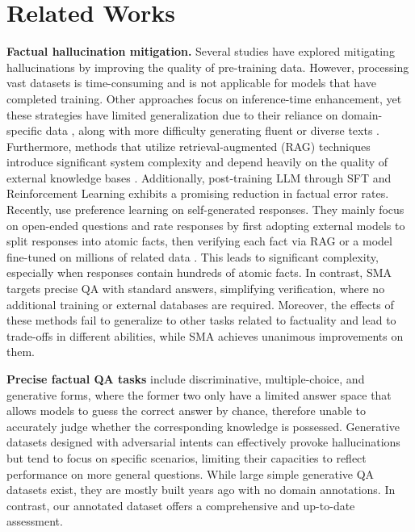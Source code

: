 \section{Related Works}
\textbf{Factual hallucination mitigation.} Several studies \citep{wang2019revisiting, gardent2017creating} have explored mitigating hallucinations by improving the quality of pre-training data. However, processing vast datasets is time-consuming \citep{zhang2023siren} and is not applicable for models that have completed training. Other approaches \citep{dola, zhang2023alleviating, li2023inference, lee2022factuality} focus on inference-time enhancement, yet these strategies have limited generalization due to their reliance on domain-specific data \citep{self-eval-skt}, along with more difficulty generating fluent or diverse texts \citep{ji2023survey}. Furthermore, methods \citep{nakano2021webgpt, gou2024critic} that utilize retrieval-augmented (RAG) techniques introduce significant system complexity \citep{facttune} and depend heavily on the quality of external knowledge bases \citep{zhang2023siren}. Additionally, post-training LLM through SFT \citep{elaraby2023halo,alignmentforhonesty} and Reinforcement Learning \citep{ouyang2022training,kang2024unfamiliar} exhibits a promising reduction in factual error rates. Recently, \citet{facttune, flame, self-eval-skt} use preference learning on self-generated responses. They mainly focus on open-ended questions and rate responses by first adopting external models to split responses into atomic facts, then verifying each fact via RAG \citep{facttune, flame} or a model fine-tuned on millions of related data \citep{self-eval-skt}. This leads to significant complexity, especially when responses contain hundreds of atomic facts. In contrast, SMA targets precise QA with standard answers, simplifying verification, where no additional training or external databases are required. Moreover, the effects of these methods fail to generalize to other tasks related to factuality and lead to trade-offs in different abilities, while SMA achieves unanimous improvements on them.

\textbf{Precise factual QA tasks} include discriminative, multiple-choice, and generative forms, where the former two \citep{thorne2018fever, MMLU, liu2022token, mishra2024fine} only have a limited answer space that allows models to guess the correct answer by chance, therefore unable to accurately judge whether the corresponding knowledge is possessed. Generative datasets designed with adversarial intents \citep{lin2022truthfulqa, cheng2023evaluating} can effectively provoke hallucinations but tend to focus on specific scenarios, limiting their capacities to reflect performance on more general questions. While large simple generative QA datasets \citep{yang2015wikiqa, joshi2017triviaqa, yang2018hotpotqa, kwiatkowski2019natural} exist, they are mostly built years ago with no domain annotations. In contrast, our annotated dataset offers a comprehensive and up-to-date assessment.
